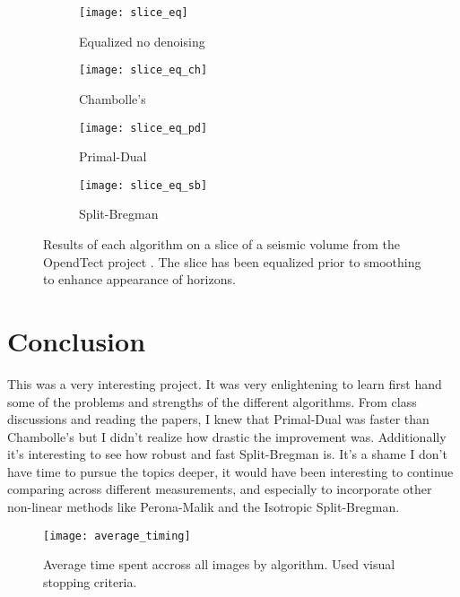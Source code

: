 \documentclass[11pt]{article}
\begin{document}
\begin{figure}
\centering
\graphicspath{{images/}}
\begin{subfigure}[b]{0.5\textwidth}
\centering
\texttt{[image: slice\_eq]}
\caption{Equalized no denoising}
\label{slice:noise}
\end{subfigure}
\begin{subfigure}[b]{0.5\textwidth}
\centering
\texttt{[image: slice\_eq\_ch]}
\caption{Chambolle's}
\label{slice:ch}
\end{subfigure}
\begin{subfigure}[b]{0.5\textwidth}
\centering
\texttt{[image: slice\_eq\_pd]}
\caption{Primal-Dual}
\label{slice:pd}
\end{subfigure}
\begin{subfigure}[b]{0.5\textwidth}
\centering
\texttt{[image: slice\_eq\_sb]}
\caption{Split-Bregman}
\label{slice:sb}
\end{subfigure}
\caption{Results of each algorithm on a slice of a seismic volume from the OpendTect project \cite{opendTectWeb}. The slice has been equalized prior to smoothing to enhance appearance of horizons.}
\label{fig:slice:dn}
\end{figure}


\section{Conclusion}

This was a very interesting project.
It was very enlightening to learn first hand some of the problems and strengths of the different algorithms.
From class discussions and reading the papers, I knew that Primal-Dual was faster than Chambolle's but I didn't realize how drastic the improvement was.
Additionally it's interesting to see how robust and fast Split-Bregman is.
It's a shame I don't have time to pursue the topics deeper, it would have been interesting to continue comparing across different measurements, and especially to incorporate other non-linear methods like Perona-Malik and the Isotropic Split-Bregman.

\begin{figure}
\centering
\graphicspath{{../images/}}
\texttt{[image: average\_timing]}
\caption{Average time spent accross all images by algorithm.  Used visual stopping criteria.}
\label{fig:timing}
\end{figure}




\end{document}
